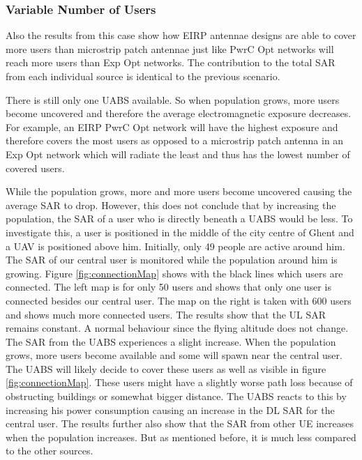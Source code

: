 \documentclass[twocolumn]{phdsymp} %
\begin{document}
\subsubsection{Variable Number of Users}

Also the results from this case show how EIRP antennae designs are able to cover more users than microstrip patch antennae
just like \gls{PwrC Opt} networks will reach more users than \gls{Exp Opt} networks.
The contribution to the total \gls{SAR} from each individual source is identical to the previous scenario. 

There is still only one \gls{UABS} available. So when population grows, more users become uncovered and 
therefore the average electromagnetic exposure decreases.
For example, an EIRP \gls{PwrC Opt} network
will have the highest exposure and therefore covers the most users as opposed to a microstrip patch antenna in 
an \gls{Exp Opt} network which will radiate the least and thus has the lowest number of covered users.

While the population grows, more and more users become uncovered causing the average SAR to drop. 
However, this does not conclude that by increasing the population, the SAR of a user who is directly beneath a \gls{UABS} would be less.
To investigate this, a user is positioned in the middle of the city centre of Ghent and a \gls{UAV} is positioned above him. Initially, only 
49 people are active around him. The \gls{SAR} of our central user is monitored while the population around him is growing.
Figure \ref{fig:connectionMap} shows with the black lines which users are connected. The left map is for only 50 users and 
shows that only one user is connected besides our central user. The map on the right is taken with 600 users and shows much more connected users.
The results show that the \gls{UL} \gls{SAR} remains constant. A normal behaviour since the flying altitude does not change.
The \gls{SAR} from the \gls{UABS} experiences a slight increase. When the population grows, more users become available 
and some will spawn near the central user. The \gls{UABS} will likely decide to cover these users as well as visible in figure \ref{fig:connectionMap}.
These users might have a slightly 
worse path loss because of obstructing buildings or somewhat bigger distance. The \gls{UABS} reacts to this by increasing 
his power consumption causing an increase in the \gls{DL} \gls{SAR} for the central user. The results further also show 
that the \gls{SAR} from other \gls{UE} increases when the population increases. But as mentioned  before, it is much less 
compared to the other sources.
\end{document}
